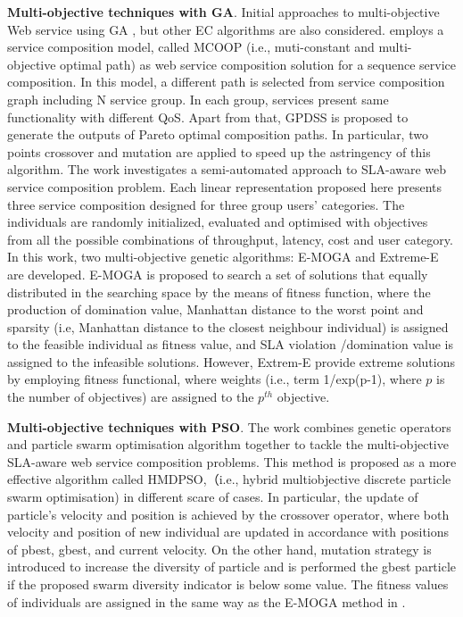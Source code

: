 \textbf{Multi-objective techniques with GA}. Initial approaches to multi-objective Web service using  GA \cite{liu2005dynamic}, but other EC algorithms are also considered. \cite{liu2005dynamic} employs a service composition model, called  MCOOP (i.e., muti-constant and multi-objective optimal path) as web service composition solution for a sequence service composition. In this model, a different path is selected from service composition graph including N service group. In each group,  services present same functionality with different QoS.  Apart from that, GPDSS is proposed to generate the outputs of Pareto optimal composition paths. In particular, two points crossover and mutation are applied to speed up the astringency of this algorithm. The work \cite{wada2012e3} investigates a semi-automated approach to SLA-aware web service composition problem.  Each linear representation proposed here presents three service composition designed for three group users' categories.  The individuals are randomly initialized, evaluated and optimised with objectives from all the possible combinations of throughput, latency, cost and user category.  In this work, two multi-objective genetic algorithms: E-MOGA and Extreme-E are developed. E-MOGA is proposed to search a set of solutions that equally distributed in the searching space by the means of fitness function, where the production of domination value,  Manhattan distance to the worst point and sparsity (i.e, Manhattan distance to the closest neighbour individual)  is assigned to the feasible individual as fitness value, and SLA violation /domination value is assigned to the infeasible solutions. However, Extrem-E provide extreme solutions by employing fitness functional, where weights (i.e., term 1/exp(p-1), where $p$ is the number of objectives) are assigned to the $p^{th}$ objective.

\textbf{Multi-objective techniques with PSO}. The work \cite{yin2014hybrid} combines genetic operators and particle swarm optimisation algorithm together to tackle the multi-objective SLA-aware web service composition problems. This method is proposed as a more effective algorithm called HMDPSO,（i.e., hybrid multiobjective discrete particle swarm optimisation) in different scare of cases. In particular, the update of particle's velocity and position is achieved by the crossover operator, where both velocity and position of new individual are updated in accordance with positions of pbest, gbest, and current velocity. On the other hand, mutation strategy is introduced to increase the diversity of particle and is performed the gbest particle if the proposed swarm diversity indicator is below some value.  The fitness values of individuals are assigned in the same way as the E-MOGA method in \cite{wada2012e3}.

